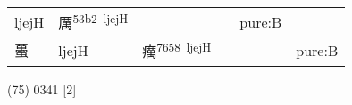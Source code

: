\documentclass[14pt,a4paper]{scrartcl}
\begin{document}
\begin{longtable}[c]{@{}llllll@{}}
\begin{minipage}[t]{0.14\columnwidth}
ljejH
\strut\end{minipage} &
\begin{minipage}[t]{0.14\columnwidth}\raggedright\strut
厲\textsuperscript{53b2~ljejH}
\strut\end{minipage} &
\begin{minipage}[t]{0.14\columnwidth}\raggedright\strut
\strut\end{minipage} &
\begin{minipage}[t]{0.14\columnwidth}\raggedright\strut
\strut\end{minipage} &
\begin{minipage}[t]{0.14\columnwidth}\raggedright\strut
pure:B
\strut\end{minipage}\tabularnewline
\begin{minipage}[t]{0.14\columnwidth}\raggedright\strut
蠆
\strut\end{minipage} &
\begin{minipage}[t]{0.14\columnwidth}\raggedright\strut
ljejH
\strut\end{minipage} &
\begin{minipage}[t]{0.14\columnwidth}\raggedright\strut
癘\textsuperscript{7658~ljejH}
\strut\end{minipage} &
\begin{minipage}[t]{0.14\columnwidth}\raggedright\strut
\strut\end{minipage} &
\begin{minipage}[t]{0.14\columnwidth}\raggedright\strut
\strut\end{minipage} &
\begin{minipage}[t]{0.14\columnwidth}\raggedright\strut
pure:B
\strut\end{minipage}\tabularnewline
\bottomrule
\end{longtable}

(75) 0341 {[}2{]}
\end{document}
